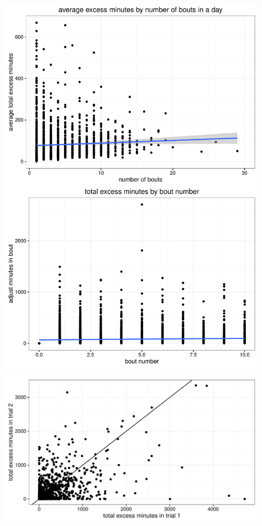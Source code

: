 \documentclass[11pt]{article}\usepackage[]{graphicx}\usepackage[]{color}
\makeatletter
\def\maxwidth{ %
  \ifdim\Gin@nat@width>\linewidth
    \linewidth
  \else
    \Gin@nat@width
  \fi
}
\newenvironment{knitrout}{}{} %
\makeatother
\begin{document}
\begin{knitrout}
\color{fgcolor}
\includegraphics[width=\maxwidth]{figure/p2c-1} 

\end{knitrout}




\begin{knitrout}
\color{fgcolor}
\includegraphics[width=\maxwidth]{figure/p4-1} 

\end{knitrout}
\end{document}
